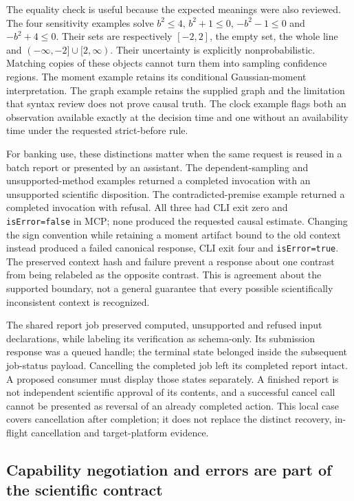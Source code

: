 The equality check is useful because the expected meanings were also reviewed.
The four sensitivity examples solve $b^2\leq4$, $b^2+1\leq0$,
$-b^2-1\leq0$ and $-b^2+4\leq0$. Their sets are respectively
$[-2,2]$, the empty set, the whole line and
$(-\infty,-2]\cup[2,\infty)$. Their uncertainty is explicitly
nonprobabilistic. Matching copies of these objects cannot turn them into
sampling confidence regions. The moment example retains its conditional
Gaussian-moment interpretation. The graph example retains the supplied graph
and the limitation that syntax review does not prove causal truth. The clock
example flags both an observation available exactly at the decision time and
one without an availability time under the requested strict-before rule.
\citep{exec16_parity_observed}

For banking use, these distinctions matter when the same request is reused
in a batch report or presented by an assistant. The dependent-sampling and
unsupported-method examples returned a completed invocation with an
unsupported scientific disposition. The contradicted-premise example returned
a completed invocation with refusal. All three had CLI exit zero and
\texttt{isError=false} in MCP; none produced the requested causal estimate.
Changing the sign convention while retaining a moment artifact bound to the
old context instead produced a failed canonical response, CLI exit four and
\texttt{isError=true}. The preserved context hash and failure prevent a
response about one contrast from being relabeled as the opposite contrast.
This is agreement about the supported boundary, not a general guarantee that
every possible scientifically inconsistent context is recognized.
\citep{exec16_parity_observed}

The shared report job preserved computed, unsupported and refused input
declarations, while labeling its verification as schema-only. Its submission
response was a queued handle; the terminal state belonged inside the subsequent
job-status payload. Cancelling the completed job left its completed report
intact. A proposed consumer must display those states separately. A finished
report is not independent scientific approval of its contents, and a successful
cancel call cannot be presented as reversal of an already completed action.
This local case covers cancellation after completion; it does not replace
the distinct recovery, in-flight cancellation and target-platform evidence.
\citep{exec16_parity_observed}

\subsection{Capability negotiation and errors are part of the scientific contract}

